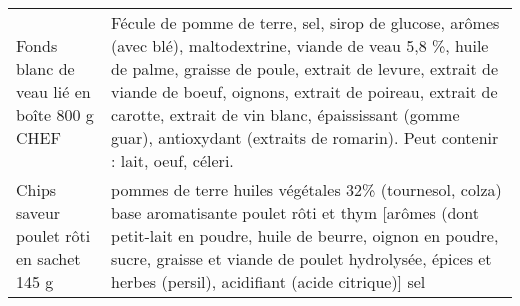 \begin{longtable}{p{5cm}p{10cm}}
                                                              Fonds blanc de veau lié en boîte 800 g CHEF &                                                                                                                                                                                                                                                                                                                                                                                                                                                                                                                                                                                                                                                                     Fécule de pomme de terre, sel, sirop de glucose, arômes (avec blé), maltodextrine, viande de veau 5,8 \%, huile de palme, graisse de poule, extrait de levure, extrait de viande de boeuf, oignons, extrait de poireau, extrait de carotte, extrait de vin blanc, épaississant (gomme guar), antioxydant (extraits de romarin).   Peut contenir : lait, oeuf, céleri. \\
                                                                 Chips saveur poulet rôti en sachet 145 g &                                                                                                                                                                                                                                                                                                                                                                                                                                                                                                                                                                                                                                                                                                                                                       pommes de terre  huiles végétales 32\% (tournesol, colza)  base aromatisante poulet rôti et thym [arômes (dont petit-lait en poudre, huile de beurre, oignon en poudre, sucre, graisse et viande de poulet hydrolysée, épices et herbes (persil), acidifiant (acide citrique)]  sel \\

\end{longtable}
